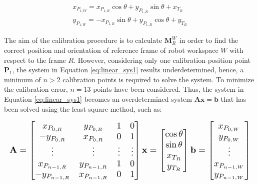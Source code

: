 \documentclass[letterpaper, 10 pt, conference]{ieeeconf}  %
\begin{document}
\begin{equation}\label{eq:linear_sys1}
\begin{gathered}
x_{P_{1,W}}=x_{P_{1,R}}\cos\theta+y_{P_{1,R}}\sin\theta+x_{T_R}\\
y_{P_{1,W}}=-x_{P_{1,R}}\sin\theta+y_{P_{1,R}}\cos\theta+y_{T_R}
\end{gathered}
\end{equation}

The aim of the calibration procedure is to calculate $\mathbf{M}^W_{R}$ in order to find the correct position and orientation of reference frame of robot workspace $W$ with respect to the frame $R$. However, considering only one calibration position point $\mathbf{P}_1$, the system in Equation \ref{eq:linear_sys1} results underdetermined, hence, a minimum of $n>2$ calibration points is required to solve the system. To minimize the calibration error, $n=13$ points have been considered. Thus, the system in Equation \ref{eq:linear_sys1} becomes an overdetermined system $\mathbf{A}\mathbf{x}=\mathbf{b}$ that has been solved using the least square method, such as:

\begin{equation}\label{eq:linear_sys2}
\resizebox{\columnwidth}{!}{$%
	\begin{gathered}
	\mathbf{A} =   \begin{bmatrix}
	x_{P_{0,R}} & y_{P_{0,R}} & 1 & 0\\
	-y_{P_{0,R}} & x_{P_{0,R}} & 0 & 1 \\
	\vdots & \vdots & \vdots & \vdots\\
	x_{P_{n-1,R}} & y_{P_{n-1,R}} & 1 & 0\\
	-y_{P_{n-1,R}} & x_{P_{n-1,R}} & 0 & 1 
	\end{bmatrix}
	\mathbf{x} =   \begin{bmatrix}
	\cos\theta\\
	\sin\theta\\
	x_{T_R}\\
	y_{T_R}
	\end{bmatrix}
	\mathbf{b} =   \begin{bmatrix}
	x_{P_{0,W}}\\
	y_{P_{0,W}}\\
	\vdots\\
	x_{P_{n-1,W}}\\
	y_{P_{n-1,W}}\\
	\end{bmatrix}
	\end{gathered}
	$%
}%
\end{equation}
\end{document}
